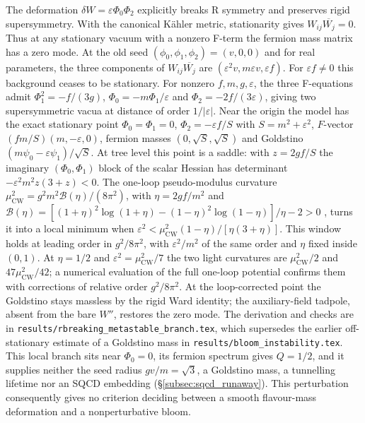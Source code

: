 \documentclass[12pt,a4paper]{article}
\begin{document}
The deformation $\delta W=\varepsilon\Phi_0\Phi_2$ explicitly
breaks R symmetry and preserves rigid supersymmetry. With the canonical
K\"ahler metric, stationarity gives $W_{ij}\overline{W_j}=0$. Thus
at any stationary vacuum with a nonzero F-term the fermion mass matrix
has a zero mode. At the old seed $(\phi_0,\phi_1,\phi_2)=(v,0,0)$
and for real parameters, the three components of
$W_{ij}\overline{W_j}$ are
$(\varepsilon^2 v,m\varepsilon v,\varepsilon f)$.
For $\varepsilon f\ne0$ this background ceases to be stationary.
For nonzero $f,m,g,\varepsilon$, the three F-equations admit
$\Phi_1^2=-f/(3g)$, $\Phi_0=-m\Phi_1/\varepsilon$ and
$\Phi_2=-2f/(3\varepsilon)$, giving two supersymmetric vacua at
distance of order $1/|\varepsilon|$.
Near the origin the model has the exact stationary point
$\Phi_0=\Phi_1=0$, $\Phi_2=-\varepsilon f/S$ with $S=m^2+\varepsilon^2$,
$F$-vector $(fm/S)(m,-\varepsilon,0)$, fermion masses $(0,\sqrt S,\sqrt S)$
and Goldstino $(m\psi_0-\varepsilon\psi_1)/\sqrt S$. At tree level this
point is a saddle: with $z=2gf/S$ the imaginary $(\Phi_0,\Phi_1)$ block of
the scalar Hessian has determinant $-\varepsilon^2m^2z(3+z)<0$. The one-loop
pseudo-modulus curvature
$\mu^2_{\text{CW}}=g^2m^2\mathcal B(\eta)/(8\pi^2)$, with $\eta=2gf/m^2$ and
$\mathcal B(\eta)=[(1+\eta)^2\log(1+\eta)-(1-\eta)^2\log(1-\eta)]/\eta-2>0$
\cite{IS2007}, turns it into a local minimum when
$\varepsilon^2<\mu^2_{\text{CW}}(1-\eta)/[\eta(3+\eta)]$. This window holds
at leading order in $g^2/8\pi^2$, with $\varepsilon^2/m^2$ of the same order
and $\eta$ fixed inside $(0,1)$. At $\eta=1/2$ and
$\varepsilon^2=\mu^2_{\text{CW}}/7$ the two light curvatures are
$\mu^2_{\text{CW}}/2$ and $47\mu^2_{\text{CW}}/42$; a numerical evaluation of
the full one-loop potential confirms them with corrections of relative
order $g^2/8\pi^2$. At the loop-corrected point the Goldstino stays
massless by the rigid Ward identity; the auxiliary-field tadpole, absent
from the bare $W''$, restores the zero mode. The derivation and checks are
in \texttt{results/rbreaking\_metastable\_branch.tex}, which supersedes the
earlier off-stationary estimate of a Goldstino mass in
\texttt{results/bloom\_instability.tex}. This local branch sits near
$\Phi_0=0$, its fermion spectrum gives $Q=1/2$, and it supplies neither the
seed radius $gv/m=\sqrt3$, a Goldstino mass, a tunnelling lifetime nor an
SQCD embedding (\S\ref{subsec:sqcd_runaway}).
This perturbation consequently gives no criterion deciding between
a smooth flavour-mass deformation and a nonperturbative bloom.
\end{document}
